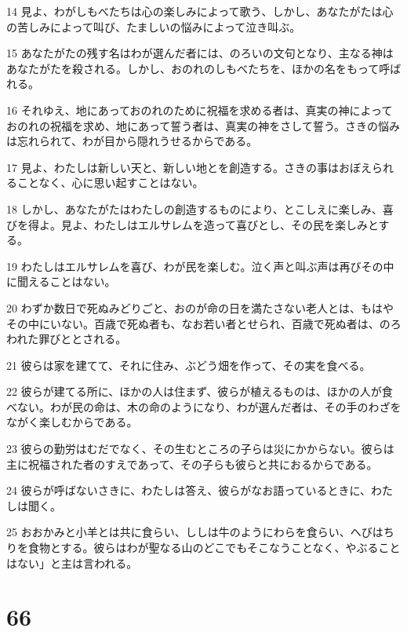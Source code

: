 \par 14 見よ、わがしもべたちは心の楽しみによって歌う、しかし、あなたがたは心の苦しみによって叫び、たましいの悩みによって泣き叫ぶ。
\par 15 あなたがたの残す名はわが選んだ者には、のろいの文句となり、主なる神はあなたがたを殺される。しかし、おのれのしもべたちを、ほかの名をもって呼ばれる。
\par 16 それゆえ、地にあっておのれのために祝福を求める者は、真実の神によっておのれの祝福を求め、地にあって誓う者は、真実の神をさして誓う。さきの悩みは忘れられて、わが目から隠れうせるからである。
\par 17 見よ、わたしは新しい天と、新しい地とを創造する。さきの事はおぼえられることなく、心に思い起すことはない。
\par 18 しかし、あなたがたはわたしの創造するものにより、とこしえに楽しみ、喜びを得よ。見よ、わたしはエルサレムを造って喜びとし、その民を楽しみとする。
\par 19 わたしはエルサレムを喜び、わが民を楽しむ。泣く声と叫ぶ声は再びその中に聞えることはない。
\par 20 わずか数日で死ぬみどりごと、おのが命の日を満たさない老人とは、もはやその中にいない。百歳で死ぬ者も、なお若い者とせられ、百歳で死ぬ者は、のろわれた罪びととされる。
\par 21 彼らは家を建てて、それに住み、ぶどう畑を作って、その実を食べる。
\par 22 彼らが建てる所に、ほかの人は住まず、彼らが植えるものは、ほかの人が食べない。わが民の命は、木の命のようになり、わが選んだ者は、その手のわざをながく楽しむからである。
\par 23 彼らの勤労はむだでなく、その生むところの子らは災にかからない。彼らは主に祝福された者のすえであって、その子らも彼らと共におるからである。
\par 24 彼らが呼ばないさきに、わたしは答え、彼らがなお語っているときに、わたしは聞く。
\par 25 おおかみと小羊とは共に食らい、ししは牛のようにわらを食らい、へびはちりを食物とする。彼らはわが聖なる山のどこでもそこなうことなく、やぶることはない」と主は言われる。

\chapter{66}

